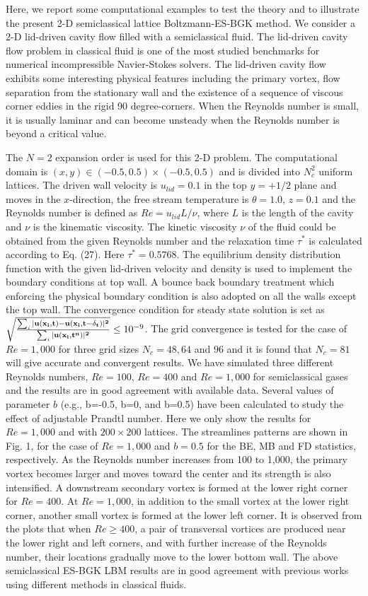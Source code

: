 \documentclass[aip,jmp,amsmath,amssymb,reprint,noshowpacs]{revtex4-1}
\begin{document}
Here, we report some computational examples to test the theory and to illustrate the present 2-D semiclassical lattice Boltzmann-ES-BGK method. We consider a 2-D lid-driven cavity flow filled with a semiclassical fluid. The lid-driven cavity flow problem in classical fluid is one of the most studied benchmarks for numerical incompressible Navier-Stokes solvers.  The lid-driven cavity flow exhibits some interesting physical features including the primary vortex, flow separation from the stationary wall and the existence of a sequence of viscous corner eddies in the rigid 90 degree-corners. When the Reynolds number is small, it is usually laminar and can become unsteady when the Reynolds number is beyond a critical value.

The $N=2$ expansion order is used for this 2-D problem. The computational domain is $(x,y) \in  (-0.5,0.5)\times(-0.5,0.5)$ and is divided into $N_c^2$ uniform lattices.   The driven wall velocity is $u_{lid}=0.1$ in the top $y=+1/2$ plane and moves in the $x$-direction, the free stream temperature is $\theta=1.0$, $z=0.1$ and the Reynolds number is defined as $Re =u_{lid} L/\nu$, where $L$ is the length of the cavity and $\nu$ is the kinematic viscosity.   The kinetic viscosity $\nu$ of the fluid could be obtained from the given Reynolds number and the relaxation time $\tau^*$ is calculated according to Eq. (27).  Here  $\tau^*=0.5768$.  The equilibrium density distribution function with the given lid-driven velocity and density is used to implement the boundary conditions at top wall.  A bounce back boundary treatment which enforcing the physical boundary condition is also adopted on all the walls except the top wall.
The convergence condition for steady state solution is set as $ \sqrt{ \frac{ \sum_i |\bf{u} (\bf{x}_i, t)-\bf{u} (\bf{x}_i, t-\delta_t)|^2}{\sum_i |\bf{u} (\bf{x}_i, t^n)|^2 } } \leq 10^{-9}$.  The grid convergence is tested for the case of $Re=1,000$ for three grid sizes $N_c=48, 64$ and $96$ and it is found that $N_c=81$ will give accurate and convergent results.  We have simulated three different Reynolds numbers, $Re=100$, $Re=400$ and $Re=1,000$ for semiclassical gases and the results are in good agreement with available data.  Several values of parameter $b$ (e.g., b=-0.5, b=0, and b=0.5) have been calculated to study the effect of adjustable Prandtl number.  Here we only show the results for $Re=1,000$ and with $200 \times 200$ lattices.   The streamlines patterns are shown in Fig. 1, for the case of $Re=1,000$ and $b=0.5$ for the BE, MB and FD statistics, respectively.
As the Reynolds number increases from 100 to 1,000, the primary vortex becomes larger and moves toward the center and its strength is also intensified. A downstream secondary vortex is formed at the lower right corner for $Re=400$.  At $Re=1,000$, in addition to the small vortex at the lower right corner, another small vortex is formed at the lower left corner. It is observed from the plots that when $Re \ge 400$, a pair of transversal vortices are produced near the lower right and left corners, and with further increase of the Reynolds number, their locations gradually move to the lower bottom wall. The above semiclassical ES-BGK LBM results are in good agreement with previous works \cite{Yang1998, YuD2003, Alben2005} using different methods in classical fluids.
\end{document}
